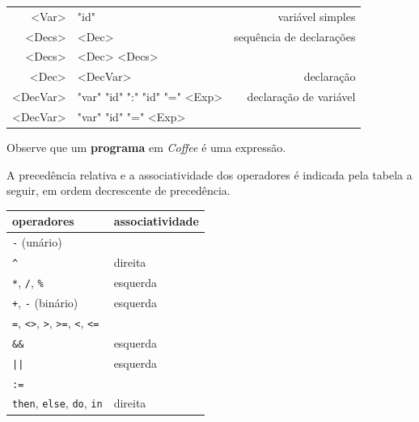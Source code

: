 \documentclass[a4paper,11pt,brazil]{article}
\newcommand{\lang}{\textsl{Coffee}}
\begin{document}
\begin{synshorts}
\begin{longtable}{r@{$\;\rightarrow\;$}lr}
      <Var>        & "id"                                                & variável simples        \\[.9em]

      <Decs>       & <Dec>                                               & sequência de declarações\\
      <Decs>       & <Dec> <Decs>                                        &                         \\[.9em]

      <Dec>        & <DecVar>                                            & declaração              \\[.9em]

      <DecVar>     & "var" "id" ":" "id" "=" <Exp>                       & declaração de variável  \\
      <DecVar>     & "var" "id" "=" <Exp>                                &                         \\[.9em]
    \end{longtable}
  \end{synshorts}

Observe que um \textbf{programa} em \lang{} é uma expressão.

A precedência relativa e a associatividade dos operadores é indicada
pela tabela a seguir, em ordem decrescente de precedência.
\begin{center}
  \begin{tabular}{|l|l|}\hline
    \textbf{operadores}                                                       & \textbf{associatividade} \\\hline
    \texttt{-} (unário)                                                       &                          \\\hline
    \texttt{\textasciicircum}                                                 & direita                  \\\hline
    \texttt{*}, \texttt{/}, \texttt{\%}                                       & esquerda                 \\\hline
    \texttt{+}, \texttt{-} (binário)                                          & esquerda                 \\\hline
    \texttt{=}, \texttt{<>}, \texttt{>}, \texttt{>=}, \texttt{<}, \texttt{<=} &                          \\\hline
    \texttt{\&\&}                                                             & esquerda                 \\\hline
    \texttt{||}                                                               & esquerda                 \\\hline
    \texttt{:=}                                                               &                          \\\hline
    \texttt{then}, \texttt{else}, \texttt{do}, \texttt{in}                    & direita                  \\\hline
  \end{tabular}
\end{center}
\end{document}
